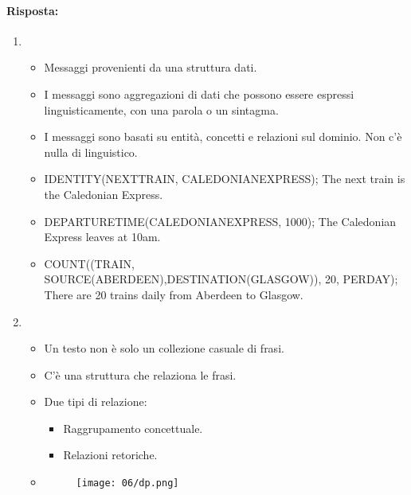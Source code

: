 
\paragraph{Risposta:}

\begin{enumerate}
  \item {} 
    \begin{itemize}
      \item Messaggi provenienti da una struttura dati. 
      \item I messaggi sono aggregazioni di dati che possono essere espressi linguisticamente, con una parola o un sintagma. 
      \item I messaggi sono basati su entità, concetti e relazioni sul dominio. Non c'è nulla di linguistico.  
      \item {} IDENTITY(NEXTTRAIN, CALEDONIANEXPRESS); The next train is the Caledonian Express.
      \item {} DEPARTURETIME(CALEDONIANEXPRESS, 1000); The Caledonian Express leaves at 10am. 
      \item {} COUNT((TRAIN, SOURCE(ABERDEEN),DESTINATION(GLASGOW)), 20, PERDAY); There are 20 trains daily from Aberdeen to Glasgow.
    \end{itemize}
  \item {}
    \begin{itemize}
      \item Un testo non è solo un collezione casuale di frasi. 
      \item C'è una struttura che relaziona le frasi. 
      \item Due tipi di relazione:
        \begin{itemize}
          \item Raggrupamento concettuale. 
          \item Relazioni retoriche.
        \end{itemize}
      \item {}
\begin{figure}[h]
    \centering
    \texttt{[image: 06/dp.png]}
\end{figure}


\end{itemize}
\end{enumerate}
